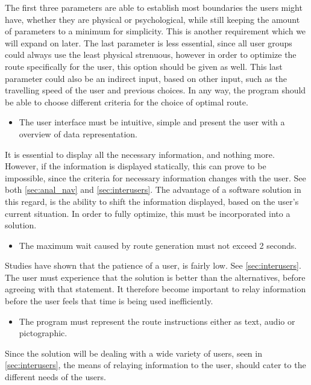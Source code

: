 The first three parameters are able to establish most boundaries the users might have, whether they are physical or psychological, while still keeping the amount of parameters to a minimum for simplicity. This is another requirement which we will expand on later. The last parameter is less essential, since all user groups could always use the least physical strenuous, however in order to optimize the route specifically for the user, this option should be given as well. This last parameter could also be an indirect input, based on other input, such as the travelling speed of the user and previous choices. In any way, the program should be able to choose different criteria for the choice of optimal route.

\begin{itemize}
	\item The user interface must be intuitive, simple and present the user with a overview of data representation.
\end{itemize}

It is essential to display all the necessary information, and nothing more. However, if the information is displayed statically, this can prove to be impossible, since the criteria for necessary information changes with the user. See both \cref{sec:anal_nav} and \cref{sec:interusers}. The advantage of a software solution in this regard, is the ability to shift the information displayed, based on the user's current situation. In order to fully optimize, this must be incorporated into a solution.

\begin{itemize}
	\item The maximum wait caused by route generation must not exceed 2 seconds.\label{irm_tid}
\end{itemize}

Studies have shown that the patience of a user, is fairly low. See \cref{sec:interusers}. The user must experience that the solution is better than the alternatives, before agreeing with that statement. It therefore become important to relay information before the user feels that time is being used inefficiently.

\begin{itemize}
	\item The program must represent the route instructions either as text, audio or pictographic.
\end{itemize}

Since the solution will be dealing with a wide variety of users, seen in \cref{sec:interusers}, the means of relaying information to the user, should cater to the different needs of the users.



